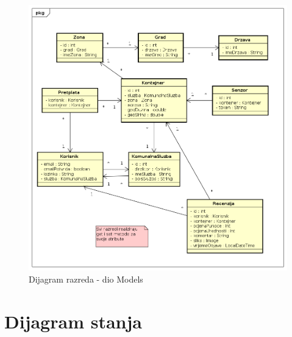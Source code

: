 			\begin{figure}[H]
				\includegraphics[width=1.0\linewidth]{slike/dijagramRazredaModels.png}
				\centering
				\caption{Dijagram razreda - dio Models}
				\label{fig:dijagramRazredaModels}
			\end{figure}
		
%			
			
			
			
			\eject
		
		\section{Dijagram stanja}
			
			
%			
			
			
			\eject 
		
